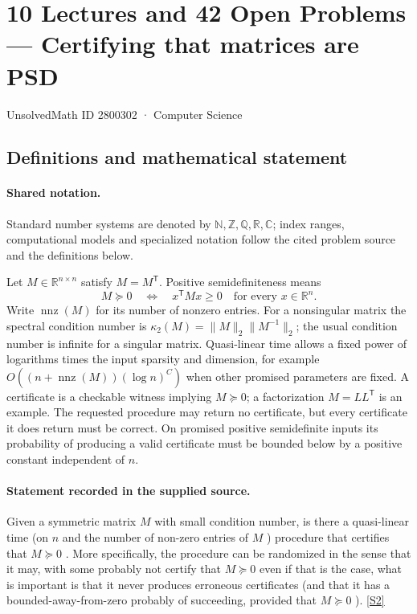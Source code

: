 \documentclass[11pt]{article}
\newcommand{\sref}[2]{\hyperlink{source:#1:#2}{[S#2]}}
\begin{document}
\setcounter{section}{2800301}
\section{10 Lectures and 42 Open Problems — Certifying that matrices are PSD}\label{2800302}
{\small\sffamily UnsolvedMath ID 2800302 · Computer Science}
\subsection{Definitions and mathematical statement}

\paragraph{Shared notation.}Standard number systems are denoted by $\mathbb N,\mathbb Z,\mathbb Q,\mathbb R,\mathbb C$; index ranges, computational models and specialized notation follow the cited problem source and the definitions below.


Let $M\in\mathbb{R}^{n\times n}$ satisfy $M=M^{\mathsf T}$. Positive semidefiniteness means
\[
 M\succeq0\quad\Longleftrightarrow\quad x^{\mathsf T}Mx\ge0\quad\text{for every }x\in\mathbb{R}^n.
\]
Write $\operatorname{nnz}(M)$ for its number of nonzero entries. For a nonsingular matrix the spectral condition number is $\kappa_2(M)=\|M\|_2\|M^{-1}\|_2$; the usual condition number is infinite for a singular matrix. Quasi-linear time allows a fixed power of logarithms times the input sparsity and dimension, for example $O((n+\operatorname{nnz}(M))(\log n)^C)$ when other promised parameters are fixed. A certificate is a checkable witness implying $M\succeq0$; a factorization $M=LL^{\mathsf T}$ is an example. The requested procedure may return no certificate, but every certificate it does return must be correct. On promised positive semidefinite inputs its probability of producing a valid certificate must be bounded below by a positive constant independent of $n$.
\paragraph{Statement recorded in the supplied source.}
Given a symmetric matrix ${M}$ with small condition number, is there a quasi-linear time (on ${n}$ and the number of non-zero entries of ${M}$ ) procedure that certifies that ${M\succeq 0}$ . More specifically, the procedure can be randomized in the sense that it may, with some probably not certify that ${M\succeq 0}$ even if that is the case, what is important is that it never produces erroneous certificates (and that it has a bounded-away-from-zero probably of succeeding, provided that ${M\succeq 0}$ ). \sref{2800302}{2}
\end{document}
